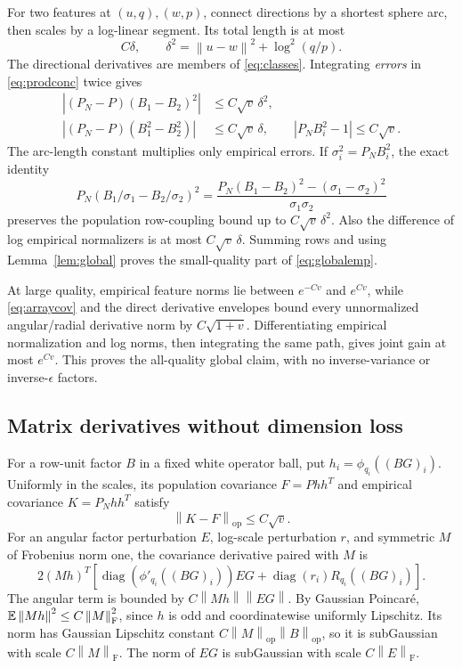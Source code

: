 \documentclass[11pt]{article}
\newcommand{\diag}{\operatorname{diag}}\newcommand{\sech}{\operatorname{sech}}
\newcommand{\op}{\mathrm{op}}\newcommand{\F}{\mathrm F}
\newcommand{\norm}[1]{\left\lVert#1\right\rVert}
\begin{document}
For two features at $(u,q),(w,p)$, connect directions by a shortest sphere arc, then scales by a log-linear segment. Its total length is at most
\[
 C\delta,\qquad\delta^2=\norm{u-w}^2+\log^2(q/p).
\]
The directional derivatives are members of \eqref{eq:classes}. Integrating \emph{errors} in \eqref{eq:prodconc} twice gives
\begin{align}
 |(P_N-P)(B_1-B_2)^2|&\le C\sqrt v\,\delta^2,\label{eq:secants}\\
 |(P_N-P)(B_1^2-B_2^2)|&\le C\sqrt v\,\delta,\qquad |P_NB_i^2-1|\le C\sqrt v.\nonumber
\end{align}
The arc-length constant multiplies only empirical errors. If $\sigma_i^2=P_NB_i^2$, the exact identity
\[
 P_N(B_1/\sigma_1-B_2/\sigma_2)^2
 =\frac{P_N(B_1-B_2)^2-(\sigma_1-\sigma_2)^2}{\sigma_1\sigma_2}
\]
preserves the population row-coupling bound up to $C\sqrt v\,\delta^2$. Also the difference of log empirical normalizers is at most $C\sqrt v\,\delta$. Summing rows and using Lemma~\ref{lem:global} proves the small-quality part of \eqref{eq:globalemp}.

At large quality, empirical feature norms lie between $e^{-Cv}$ and $e^{Cv}$, while \eqref{eq:arraycov} and the direct derivative envelopes bound every unnormalized angular/radial derivative norm by $C\sqrt{1+v}$. Differentiating empirical normalization and log norms, then integrating the same path, gives joint gain at most $e^{Cv}$. This proves the all-quality global claim, with no inverse-variance or inverse-$\epsilon$ factors.

\subsection{Matrix derivatives without dimension loss}
For a row-unit factor $B$ in a fixed white operator ball, put $h_i=\phi_{q_i}((BG)_i)$. Uniformly in the scales, its population covariance $F=Phh^T$ and empirical covariance $K=P_Nhh^T$ satisfy
\begin{equation}\label{eq:rawlocal}
 \norm{K-F}_\op\le C\sqrt v.
\end{equation}
For an angular factor perturbation $E$, log-scale perturbation $r$, and symmetric $M$ of Frobenius norm one, the covariance derivative paired with $M$ is
\begin{equation}\label{eq:dual}
 2(Mh)^T\left[\diag(\phi'_{q_i}((BG)_i))EG
                   +\diag(r_i)R_{q_i}((BG)_i)\right].
\end{equation}
The angular term is bounded by $C\norm{Mh}\norm{EG}$. By Gaussian Poincar\'e, $\E\norm{Mh}^2\le C\norm M_\F^2$, since $h$ is odd and coordinatewise uniformly Lipschitz. Its norm has Gaussian Lipschitz constant $C\norm M_\op\norm B_\op$, so it is subGaussian with scale $C\norm M_\F$. The norm of $EG$ is subGaussian with scale $C\norm E_\F$.
\end{document}
